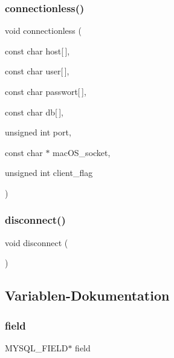 \mbox{\label{connection_8cpp_adda241635377573037e48ec03e645c22}} 
\subsubsection{connectionless()}
{\footnotesize\ttfamily void connectionless (\begin{DoxyParamCaption}\item[{const char}]{host[$\,$],  }\item[{const char}]{user[$\,$],  }\item[{const char}]{passwort[$\,$],  }\item[{const char}]{db[$\,$],  }\item[{unsigned int}]{port,  }\item[{const char $\ast$}]{mac\+O\+S\+\_\+socket,  }\item[{unsigned int}]{client\+\_\+flag }\end{DoxyParamCaption})}

\mbox{\label{connection_8cpp_a960705de531a20389fb29928d43258c3}} 
\subsubsection{disconnect()}
{\footnotesize\ttfamily void disconnect (\begin{DoxyParamCaption}{ }\end{DoxyParamCaption})}



\subsection{Variablen-\/\+Dokumentation}
\mbox{\label{connection_8cpp_a37d24f00a2791852c5c2e3d0acf3845e}} 
\subsubsection{field}
{\footnotesize\ttfamily M\+Y\+S\+Q\+L\+\_\+\+F\+I\+E\+LD$\ast$ field}

\mbox{\label{connection_8cpp_a801f961b24f1ddf0c1f88a41fd67e764}} 
